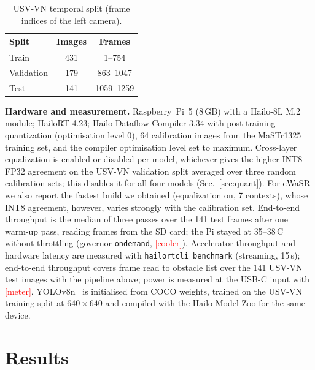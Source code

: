 \documentclass[conference]{IEEEtran}
\newcommand{\tbd}[1]{\textcolor{red}{[#1]}}
\begin{document}
\begin{table}[t]
\centering
\caption{USV-VN temporal split (frame indices of the left camera).}
\label{tab:usvvn}
\begin{tabular}{lcc}
\toprule
Split & Images & Frames \\
\midrule
Train      & 431 & 1--754 \\
Validation & 179 & 863--1047 \\
Test       & 141 & 1059--1259 \\
\bottomrule
\end{tabular}
\end{table}

\textbf{Hardware and measurement.} Raspberry~Pi~5 (8\,GB) with a Hailo-8L M.2 module; HailoRT 4.23; Hailo Dataflow Compiler 3.34 with post-training quantization (optimisation level 0), 64 calibration images from the MaSTr1325 training set, and the compiler optimisation level set to maximum. Cross-layer equalization is enabled or disabled per model, whichever gives the higher INT8--FP32 agreement on the USV-VN validation split averaged over three random calibration sets; this disables it for all four models (Sec.~\ref{sec:quant}). For eWaSR we also report the fastest build we obtained (equalization on, 7 contexts), whose INT8 agreement, however, varies strongly with the calibration set. End-to-end throughput is the median of three passes over the 141 test frames after one warm-up pass, reading frames from the SD card; the Pi stayed at 35--38\,\textdegree C without throttling (governor \texttt{ondemand}, \tbd{cooler}). Accelerator throughput and hardware latency are measured with \texttt{hailortcli benchmark} (streaming, 15\,s); end-to-end throughput covers frame read to obstacle list over the 141 USV-VN test images with the pipeline above; power is measured at the USB-C input with \tbd{meter}. YOLOv8n~\cite{jocher2023yolov8} is initialised from COCO weights, trained on the USV-VN training split at $640\times640$ and compiled with the Hailo Model Zoo for the same device.

\section{Results}
\end{document}
